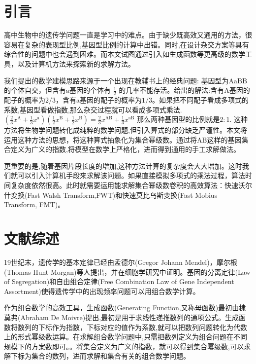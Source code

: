 \documentclass[12pt]{article} %
\begin{document}
\newpage

\tableofcontents %

\newpage

\section{引言}

高中生物中的遗传学问题一直是学习中的难点。由于缺少既高效又通用的方法，很容易在复杂的表现型比例,基因型比例的计算中出错。同时,在设计杂交方案等具有综合性的问题中也会遇到困难。而本文试图通过引入如生成函数等更高级的数学工具，以及计算机方法来探索新的求解方法。

我们提出的数学建模思路来源于一个出现在教辅书上的经典问题\cite{蔡雪燕2009浅谈高中生物概念教学}: 基因型为$\text{AaBB}$的个体自交，但含有$\text{a}$基因的个体有 $\frac{1}{2} $ 的几率不能存活。给出的解法\cite{张克芳2013浅析高中生物遗传学习题的解析技巧}:含有A基因的配子的概率为$2/3$，含有a基因的配子的概率为$1/3$。如果把不同配子看成多项式的系数,基因型看做指数,那么杂交过程就可以看成多项式乘法. 
$(\frac{2}{3}x^{\text{A}}+\frac{1}{3} x^{\text{a}})(\frac{1}{2}x^{\text{B}}+\frac{1}{2}x^{\text{B}})=\frac{2}{3}x^{\text{AB}}+\frac{1}{3}x^{\text{aB}}$ 那么两种基因型的比例就是$2:1$. 这种方法将生物学问题转化成纯粹的数学问题,但引入算式的部分缺乏严谨性。本文将运用这种方法的思想，将这种算式抽象化为集合幂级数。通过将$\text{AB}$这样的基因集合定义为广义的指数,将模型在数学上严格化，进而得到通用的手工求解做法。

更重要的是,随着基因片段长度的增加,这种方法计算的复杂度会大大增加。这时我们就可以引入计算机手段来求解该问题。如果直接模拟多项式的乘法过程，算法时间复杂度依然很高。此时就需要运用能求解集合幂级数卷积的高效算法：快速沃尔什变换(Fast Walsh Transform,FWT)和快速莫比乌斯变换(Fast Mobius Transform, FMT)。


\section{文献综述}

19世纪末，遗传学的基本定律已经由孟德尔(Gregor Johann Mendel)，摩尔根(Thomas Hunt Morgan)等人提出，并在细胞学研究中证明。基因的分离定律(Law of Segregation)和自由组合定律(Free Combination Law of Gene Independent Assortment)使得遗传学中的出现频率问题可以用组合数学计算。\cite{2009陈阅增普通生物学}

作为组合数学的高效工具，生成函数(Generating Function,又称母函数)最初由棣莫弗(Abraham De Moivre)提出,最初是用于求线性递推数列的通项公式。\cite{knuth2005art}生成函数将数列的下标作为指数，下标对应的值作为系数,就可以把数列问题转化为代数上的形式幂级数运算。在求解组合数学问题中,只需把数列定义为组合问题在不同规模下的方案数即可。\cite{graham1989concrete}。将集合定义为广义的指数，就可以得到集合幂级数,可以求解下标为集合的数列，进而求解和集合有关的组合数学问题。
\end{document}
